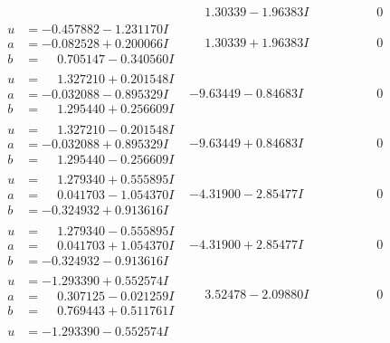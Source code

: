 \documentclass[1p]{elsarticle_modified}
\theoremstyle{definition}
\begin{document}
$$\begin{array}{c|c|c}
 & \phantom{-}1.30339 - 1.96383 I & \phantom{-0.000000 } 0 \\ \hline\begin{aligned}
u &= -0.457882 - 1.231170 I \\
a &= -0.082528 + 0.200066 I \\
b &= \phantom{-}0.705147 - 0.340560 I\end{aligned}
 & \phantom{-}1.30339 + 1.96383 I & \phantom{-0.000000 } 0 \\ \hline\begin{aligned}
u &= \phantom{-}1.327210 + 0.201548 I \\
a &= -0.032088 - 0.895329 I \\
b &= \phantom{-}1.295440 + 0.256609 I\end{aligned}
 & -9.63449 - 0.84683 I & \phantom{-0.000000 } 0 \\ \hline\begin{aligned}
u &= \phantom{-}1.327210 - 0.201548 I \\
a &= -0.032088 + 0.895329 I \\
b &= \phantom{-}1.295440 - 0.256609 I\end{aligned}
 & -9.63449 + 0.84683 I & \phantom{-0.000000 } 0 \\ \hline\begin{aligned}
u &= \phantom{-}1.279340 + 0.555895 I \\
a &= \phantom{-}0.041703 - 1.054370 I \\
b &= -0.324932 + 0.913616 I\end{aligned}
 & -4.31900 - 2.85477 I & \phantom{-0.000000 } 0 \\ \hline\begin{aligned}
u &= \phantom{-}1.279340 - 0.555895 I \\
a &= \phantom{-}0.041703 + 1.054370 I \\
b &= -0.324932 - 0.913616 I\end{aligned}
 & -4.31900 + 2.85477 I & \phantom{-0.000000 } 0 \\ \hline\begin{aligned}
u &= -1.293390 + 0.552574 I \\
a &= \phantom{-}0.307125 - 0.021259 I \\
b &= \phantom{-}0.769443 + 0.511761 I\end{aligned}
 & \phantom{-}3.52478 - 2.09880 I & \phantom{-0.000000 } 0 \\ \hline\begin{aligned}
u &= -1.293390 - 0.552574 I \\

\end{aligned}
\end{array}$$
\end{document}
